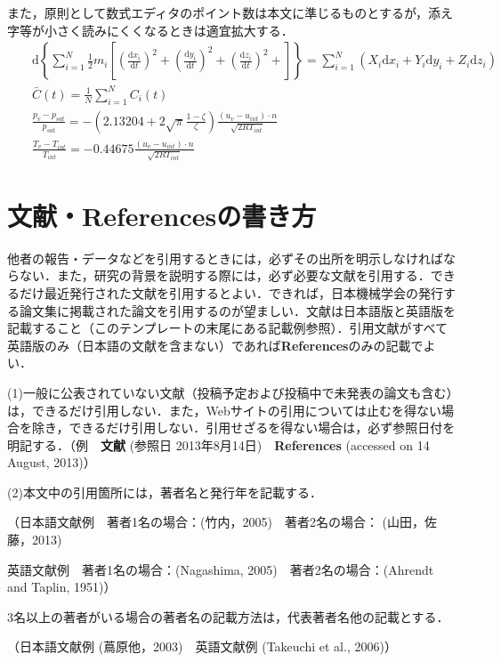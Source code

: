 \documentclass[a4jsme, fleqn]{jsmepaper}
\begin{document}
また，原則として数式エディタのポイント数は本文に準じるものとするが，添え字等が小さく読みにくくなるときは適宜拡大する．
\\
\begin{eqnarray}
&&\mbox{d}\left\{\sum^N_{i=1}\frac{1}{2}m_i\left[\left(\frac{\mbox{d}x_i}{\mbox{d}t}\right)^2+\left(\frac{\mbox{d}y_i}{\mbox{d}t}\right)^2+\left(\frac{\mbox{d}z_i}{\mbox{d}t}\right)^2+\right]\right\}=\sum^N_{i=1}(X_i\mbox{d}x_i+Y_i\mbox{d}y_i+Z_i\mbox{d}z_i)\\
&&\bar{C}(t)=\frac{1}{N}\sum^N_{i=1}C_i(t)\\
&&\frac{p_v-p_{sat}}{p_{sat}}=-\left(2.13204+2\sqrt{\pi}\frac{1-\zeta}{\zeta}\right)\frac{(u_v-u_{int})\cdot n}{\sqrt{2RT_{int}}}\\
&&\frac{T_v-T_{int}}{T_{int}}=-0.44675\frac{(u_v-u_{int})\cdot n}{\sqrt{2RT_{int}}}
\end{eqnarray}

\section{文献・Referencesの書き方}

他者の報告・データなどを引用するときには，必ずその出所を明示しなければならない．また，研究の背景を説明する際には，必ず必要な文献を引用する．できるだけ最近発行された文献を引用するとよい．できれば，日本機械学会の発行する論文集に掲載された論文を引用するのが望ましい．文献は日本語版と英語版を記載すること（このテンプレートの末尾にある記載例参照）．引用文献がすべて英語版のみ（日本語の文献を含まない）であれば\textbf{References}のみの記載でよい．

(1)一般に公表されていない文献（投稿予定および投稿中で未発表の論文も含む）は，できるだけ引用しない．また，Webサイトの引用については止むを得ない場合を除き，できるだけ引用しない．引用せざるを得ない場合は，必ず参照日付を明記する．（例　\textbf{文献} (参照日 2013年8月14日)　\textbf{References} (accessed on 14 August, 2013)）

(2)本文中の引用箇所には，著者名と発行年を記載する．

（日本語文献例　著者1名の場合：(竹内，2005)　著者2名の場合： (山田，佐藤，2013)

英語文献例　著者1名の場合：(Nagashima, 2005)　著者2名の場合：(Ahrendt and Taplin, 1951)）

3名以上の著者がいる場合の著者名の記載方法は，代表著者名他の記載とする．

（日本語文献例 (蔦原他，2003)　英語文献例 (Takeuchi et al., 2006)）
\end{document}
